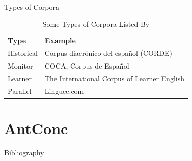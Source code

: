\documentclass{beamer}
\begin{document}
\begin{frame}{Types of Corpora}

\begin{table}[]
\centering
\caption{Some Types of Corpora Listed By }
\label{my-label}
\begin{tabular}{ll}
\textbf{Type} & \textbf{Example}  \\ 
	\pause
    Historical & Corpus diacrónico del español (CORDE)  \\
	\pause
    Monitor & COCA, Corpus de Español  \\
	\pause
    Learner & The International Corpus of Learner English  \\
	\pause
    Parallel & Linguee.com 
\end{tabular}
\end{table}
\end{frame}

\section{AntConc}
	

\begin{frame}[fragile]{Bibliography}


\end{frame}
\end{document}
